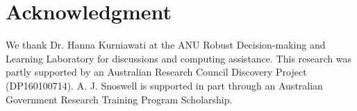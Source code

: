 \documentclass[letterpaper, 10 pt, conference]{ieeeconf}
\begin{document}
\afterpage{\clearpage}



\section*{Acknowledgment}

We thank Dr. Hanna Kurniawati at the ANU Robust Decision-making and Learning Laboratory for discussions and computing assistance.
This research was partly supported by an Australian Research Council Discovery Project (DP160100714).
A. J. Snoswell is supported in part through an Australian Government Research Training Program Scholarship. 




\end{document}
